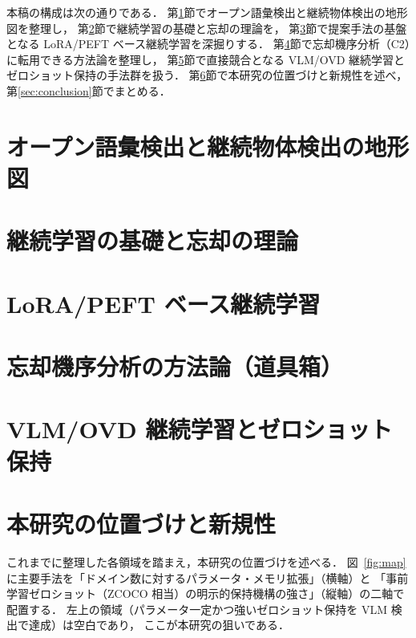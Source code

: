 \documentclass[11pt, a4j]{jarticle}
\begin{document}
本稿の構成は次の通りである．
第\ref{sec:ovd}節でオープン語彙検出と継続物体検出の地形図を整理し，
第\ref{sec:theory}節で継続学習の基礎と忘却の理論を，
第\ref{sec:lora}節で提案手法の基盤となる LoRA/PEFT ベース継続学習を深掘りする．
第\ref{sec:toolbox}節で忘却機序分析（C2）に転用できる方法論を整理し，
第\ref{sec:vlmcl}節で直接競合となる VLM/OVD 継続学習とゼロショット保持の手法群を扱う．
第\ref{sec:novelty}節で本研究の位置づけと新規性を述べ，第\ref{sec:conclusion}節でまとめる．

\section{オープン語彙検出と継続物体検出の地形図}
\label{sec:ovd}


\section{継続学習の基礎と忘却の理論}
\label{sec:theory}


\section{LoRA/PEFT ベース継続学習}
\label{sec:lora}


\section{忘却機序分析の方法論（道具箱）}
\label{sec:toolbox}


\section{VLM/OVD 継続学習とゼロショット保持}
\label{sec:vlmcl}


\section{本研究の位置づけと新規性}
\label{sec:novelty}
これまでに整理した各領域を踏まえ，本研究の位置づけを述べる．
図~\ref{fig:map}に主要手法を「ドメイン数に対するパラメータ・メモリ拡張」（横軸）と
「事前学習ゼロショット（ZCOCO 相当）の明示的保持機構の強さ」（縦軸）の二軸で配置する．
左上の領域（パラメータ一定かつ強いゼロショット保持を VLM 検出で達成）は空白であり，
ここが本研究の狙いである．
\end{document}
